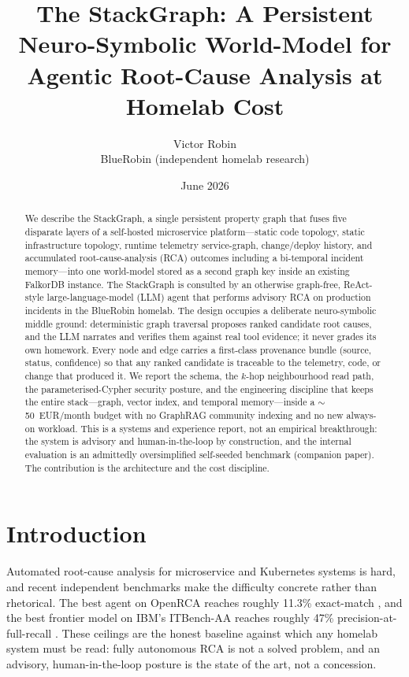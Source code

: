 \documentclass[11pt]{article}
\title{The StackGraph: A Persistent Neuro-Symbolic World-Model for\\
Agentic Root-Cause Analysis at Homelab Cost}
\author{Victor Robin\\ BlueRobin (independent homelab research)}
\date{June 2026}
\begin{document}
\maketitle

\begin{abstract}
We describe the StackGraph, a single persistent property graph that fuses five
disparate layers of a self-hosted microservice platform---static code topology,
static infrastructure topology, runtime telemetry service-graph, change/deploy
history, and accumulated root-cause-analysis (RCA) outcomes including a
bi-temporal incident memory---into one world-model stored as a second graph key
inside an existing FalkorDB instance. The StackGraph is consulted by an
otherwise graph-free, ReAct-style large-language-model (LLM) agent
\citep{yao2022react} that performs advisory RCA on production incidents in the
BlueRobin homelab. The design occupies a deliberate neuro-symbolic middle
ground: deterministic graph traversal proposes ranked candidate root causes, and
the LLM narrates and verifies them against real tool evidence; it never grades
its own homework. Every node and edge carries a first-class provenance bundle
(source, status, confidence) so that any ranked candidate is traceable to the
telemetry, code, or change that produced it. We report the schema, the $k$-hop
neighbourhood read path, the parameterised-Cypher security posture, and the
engineering discipline that keeps the entire stack---graph, vector index, and
temporal memory---inside a $\sim$50~EUR/month budget with no GraphRAG community
indexing and no new always-on workload. This is a systems and experience report,
not an empirical breakthrough: the system is advisory and human-in-the-loop by
construction, and the internal evaluation is an admittedly oversimplified
self-seeded benchmark (companion paper). The contribution is the architecture
and the cost discipline.
\end{abstract}

\section{Introduction}

Automated root-cause analysis for microservice and Kubernetes systems is hard,
and recent independent benchmarks make the difficulty concrete rather than
rhetorical. The best agent on OpenRCA reaches roughly 11.3\% exact-match
\citep{xu2025openrca}, and the best frontier model on IBM's ITBench-AA reaches
roughly 47\% precision-at-full-recall \citep{itbenchaa2026}. These ceilings are
the honest baseline against which any homelab system must be read: fully
autonomous RCA is not a solved problem, and an advisory, human-in-the-loop
posture is the state of the art, not a concession.
\end{document}
